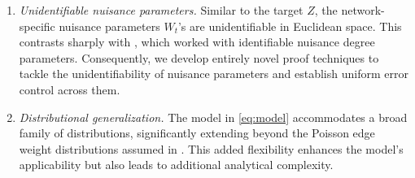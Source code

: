 \documentclass[12pt]{article}
\begin{document}
\begin{enumerate}[leftmargin=17pt]
\item \textit{Unidentifiable nuisance parameters.} Similar to the target $Z$, the network-specific nuisance parameters $W_t$'s are unidentifiable in  Euclidean space. 
This contrasts sharply with \cite{he2023semiparametric}, which worked with identifiable nuisance degree parameters.  
Consequently, we develop entirely novel proof techniques to tackle the unidentifiability of nuisance parameters and establish  uniform error control across them. 
\item \textit{Distributional generalization.} 
The model in  \eqref{eq:model} accommodates a broad family of distributions, significantly extending beyond the Poisson edge weight distributions assumed in \cite{he2023semiparametric}. This added flexibility enhances the model's applicability but also leads to additional analytical complexity. 
\end{enumerate}
\end{document}
